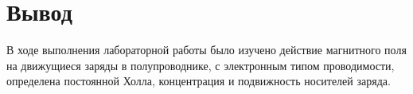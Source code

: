 \section*{Вывод}

В ходе выполнения лабораторной работы было изучено действие магнитного поля на движущиеся заряды в полупроводнике, 
с электронным типом проводимости, 
определена постоянной Холла, 
концентрация и подвижность носителей
заряда. 